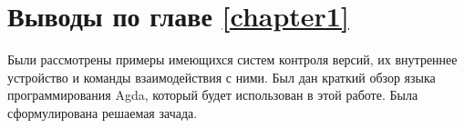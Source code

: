 \section{Выводы по главе \ref{chapter1}}

Были рассмотрены примеры имеющихся систем контроля версий, их
внутреннее устройство и команды взаимодействия с ними. Был дан краткий
обзор языка программирования Agda, который будет использован в этой
работе. Была сформулирована решаемая зачада.
